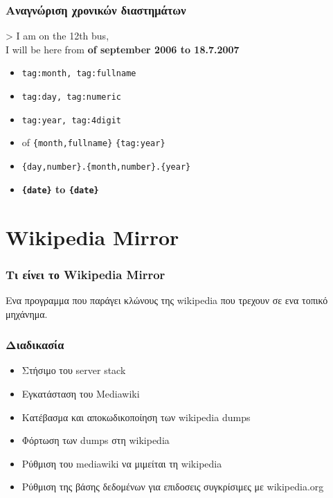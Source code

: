 \documentclass[bigger]{beamer}
\newenvironment{code}{\ttfamily}{\par}
\begin{document}
\begin{frame}
  \frametitle{Αναγνώριση χρονικών διαστημάτων}
  \begin{code}
    > I am on the {12th} bus, \\
    I will be here from \textbf<9>{
      {
        of {september}
        {\color<5-6>{magenta}2006}} to
      {18.7.{2007}}} \\
    \vspace{3.0}
  \end{code}
  \vfill
  \begin{itemize}
  \item<3-> {\color{blue}\texttt{tag:month, tag:fullname}}
  \item<4-> {\color{red}\texttt{tag:day, tag:numeric}}
  \item<5-> {\color{magenta}\texttt{tag:year, tag:4digit}}
  \item<6-> { of
      {\color<6>{blue}\texttt{\{month,fullname\}}}
      {\color<6>{magenta}\texttt{\{tag:year\}}}}
  \item<8-> \texttt{{\color{violet}\{day,number\}.\{month,number\}.\{year\}}}
  \item<9-> \textbf{{\color<9->{violet}\texttt{\{date\}}} to
      {\color<9>{violet}\texttt{\{date\}}}}
  \end{itemize}
\end{frame}

\section{Wikipedia Mirror}

\begin{frame}
  \frametitle{Τι είνει το Wikipedia Mirror}

  Ενα προγραμμα που παράγει κλώνους της wikipedia που τρεχουν σε ενα
  τοπικό μηχάνημα.

\end{frame}

\begin{frame}
  \frametitle{Διαδικασία}
  \begin{itemize}
  \item<2-> Στήσιμο του server stack
  \item<3-> Εγκατάσταση του Mediawiki
  \item<4-> Κατέβασμα και αποκωδικοποίηση των wikipedia dumps
  \item<5-> Φόρτωση των dumps στη wikipedia
  \item<6-> Ρύθμιση του mediawiki να μιμείται τη wikipedia
  \item<7-> {\color{grey}Ρύθμιση της βάσης δεδομένων για επιδοσεις
      συγκρίσιμες με wikipedia.org}
  \end{itemize}
\end{frame}
\end{document}
